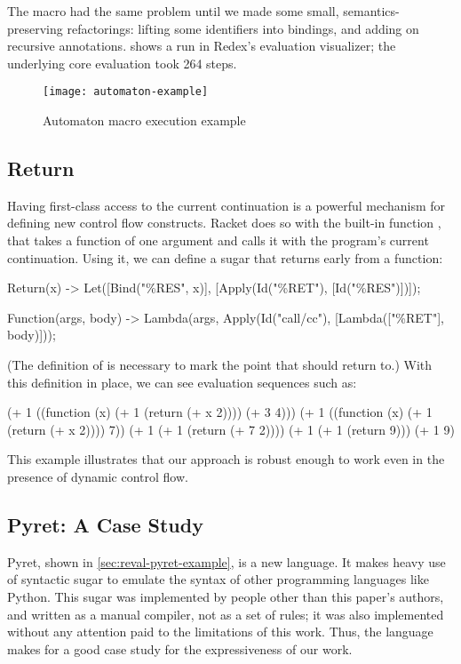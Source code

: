 The  macro had the same problem until we made some
small, semantics-preserving refactorings: lifting some identifiers
into  bindings, and adding \Code{!} on recursive
annotations.  shows a run in Redex's evaluation
visualizer; the underlying core evaluation took 264 steps.

\begin{figure}
  \mbox{}\hfill\texttt{[image: automaton-example]}\hfill\mbox{}
\caption{Automaton macro execution example}
\label{fig:reval-automaton}
\end{figure}


\subsection{Return}
  Having first-class access to the current continuation is a powerful
  mechanism for defining new control flow constructs. Racket does so with
  the built-in function , that takes a function of one
  argument and calls it with the program's current continuation. Using it,
  we can define a  sugar that returns early from a function:
  \begin{codeex}
  Return(x) ->
    Let([Bind("\%RES", x)],
        [Apply(Id("\%RET"), [Id("\%RES")])]);

  Function(args, body) ->
    Lambda(args, Apply(Id("call/cc"),
                       [Lambda(["\%RET"], body)]));
  \end{codeex}
  (The definition of  is necessary to mark the point that
   should return to.) With this definition in place, we can
  see evaluation sequences such as:
  \begin{codeex}
    (+ 1 ((function (x) (+ 1 (return (+ x 2)))) (+ 3 4)))
\sstep (+ 1 ((function (x) (+ 1 (return (+ x 2)))) 7))
\sstep (+ 1 (+ 1 (return (+ 7 2))))
\sstep (+ 1 (+ 1 (return 9)))
\sstep (+ 1 9)
  \end{codeex}
  This example illustrates that our approach is robust enough to work even
  in the presence of dynamic control flow.


\subsection{Pyret: A Case Study}
\label{sec:reval-pyret}

Pyret, shown in \cref{sec:reval-pyret-example}, is a new language. It makes
heavy use of syntactic sugar to emulate the syntax of other programming
languages like Python. This sugar was implemented by people other than
this paper's authors, and written as a manual compiler, not as a set
of rules; it was also implemented without any attention paid to the
limitations of this work. Thus, the language makes for a good case
study for the expressiveness of our work.

